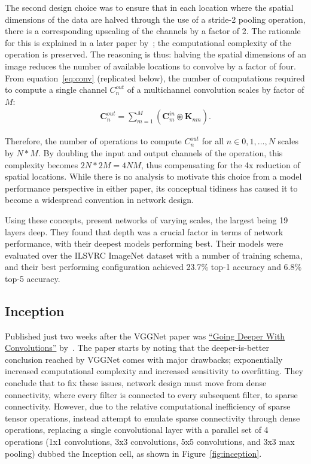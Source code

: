 The second design choice was to ensure that in each location where the spatial dimensions of the data are halved
through the use of a stride-2 pooling operation, there is a corresponding upscaling of the channels by a factor of 2.
The rationale for this is explained in a later paper by~\cite{he2015}; the computational complexity of the operation
is preserved. The reasoning is thus: halving the spatial dimensions of an image reduces the number of available locations to convolve by a factor of four.
From equation~\ref{eq:conv} (replicated below), the number of computations required to compute a single channel
$C_n^{out}$ of a multichannel convolution scales by factor of $M$:
\begin{align}
	\mathbf{C}^{out}_{n} = \sum_{m=1}^{M} (\mathbf{C}^{in}_{m} \circledast \mathbf{K}_{nm}).
\end{align}

\noindent Therefore, the number of operations to compute $C_n^{out}$ for all $n \in {0, 1, \dots , N}$ scales by $N*M$.
By doubling the input and output channels of the operation, this complexity becomes \newline $2N * 2M = 4NM$,
thus compensating for the 4x reduction of spatial locations. While there is no analysis to motivate this choice
from a model performance perspective in either paper, its conceptual tidiness has caused it to become a widespread
convention in network design.

Using these concepts, \citeauthor{simon2014} present networks of varying scales, the largest being 19 layers deep. They
found that depth was a crucial factor in terms of network performance, with their deepest models performing best. Their
models were evaluated over the ILSVRC ImageNet dataset with a number of training schema, and their best performing
configuration achieved 23.7\% top-1 accuracy and 6.8\% top-5 accuracy.

\subsection{Inception}
Published just two weeks after the VGGNet paper was \hyperlink{cite.szegedy2014}{``Going Deeper With Convolutions''} by~\cite{szegedy2014}.
The paper starts by noting that the deeper-is-better conclusion reached by VGGNet comes with major drawbacks;
exponentially increased computational complexity and increased sensitivity to overfitting. They conclude that to fix
these issues, network design must move from dense connectivity, where every filter is connected to every
subsequent filter, to sparse connectivity. However, due to the relative computational inefficiency of sparse tensor
operations, \citeauthor{szegedy2014} instead attempt to emulate sparse connectivity through dense operations, replacing a single
convolutional layer with a parallel set of 4 operations (1x1 convolutions, 3x3 convolutions, 5x5 convolutions,
and 3x3 max pooling) dubbed the Inception cell, as shown in Figure~\ref{fig:inception}.

